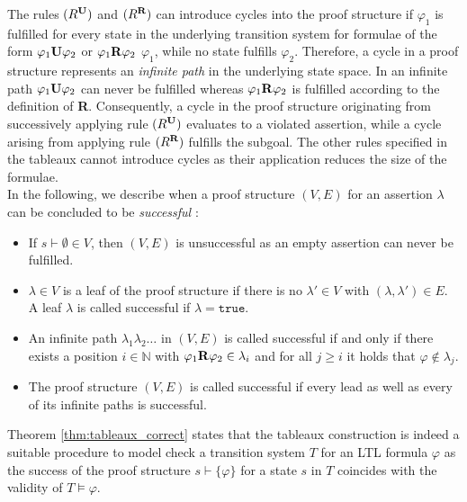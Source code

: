 \documentclass[a4paper, 12pt, twoside]{report}
\begin{document}
	The rules $(R^{\text{\textbf{U}}})$ and $(R^{\text{\textbf{R}}})$ can introduce cycles into the proof structure if $\varphi_1$ is fulfilled for every state in the underlying transition system for formulae of the form $\varphi_1 \text{\textbf{U}} \varphi_2$ or $\varphi_1 \text{\textbf{R}} \varphi_2$ $\varphi_1$, while no state fulfills $\varphi_2$. Therefore, a cycle in a proof structure represents an \textit{infinite path} in the underlying state space. In an infinite path $\varphi_1 \text{\textbf{U}} \varphi_2$ can never be fulfilled whereas $\varphi_1 \text{\textbf{R}} \varphi_2$ is fulfilled according to the definition of \textbf{R}. Consequently, a cycle in the proof structure originating from successively applying rule $(R^{\text{\textbf{U}}})$ evaluates to a violated assertion, while a cycle arising from applying rule $(R^{\text{\textbf{R}}})$ fulfills the subgoal. The other rules specified in the tableaux cannot introduce cycles as their application reduces the size of the formulae. \\
	
	In the following, we describe when a proof structure $(V,E)$ for an assertion $\lambda$ can be concluded to be \textit{successful} \cite{bhat1995efficient}:
	
	\begin{itemize}
		\item If $s \vdash \emptyset \in V$, then $(V,E)$ is unsuccessful as an empty assertion can never be fulfilled.
		\item $\lambda \in V$ is a leaf of the proof structure if there is no $\lambda' \in V$ with $(\lambda, \lambda') \in E$. A leaf $\lambda$ is called successful if $\lambda = \texttt{true}$.
		\item An infinite path $\lambda_1 \lambda_2 \dots$ in $(V,E)$ is called successful if and only if there exists a position $i\in \mathds{N}$ with $\varphi_1 \text{\textbf{R}} \varphi_2 \in \lambda_i$ and for all $j \geq i$ it holds that $\varphi \notin \lambda_j$.
		\item The proof structure $(V,E)$ is called successful if every lead as well as every of its infinite paths is successful.
	\end{itemize} 
	
	Theorem \ref{thm:tableaux_correct} states that the tableaux construction is indeed a suitable procedure to model check a transition system $T$ for an LTL formula $\varphi$ as the success of the proof structure $s \vdash \{\varphi\}$ for a state $s$ in $T$ coincides with the validity of $T \models \varphi$.
	
\end{document}
